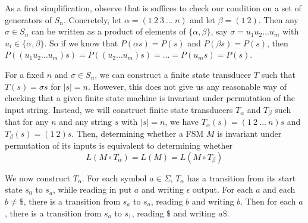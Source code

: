\documentclass{llncs}
\begin{document}
    As a first simplification, observe that is
    suffices to check our condition on a set
    of generators of $S_n$.
    Concretely, let $\alpha = (1\ 2\ 3\ ...\ n)$
    and let $\beta = (1\ 2)$.
    Then any $\sigma \in S_n$ can be written as
    a product of elements of $\{\alpha,\beta\}$,
    say $\sigma = u_1 u_2\ldots u_m$ with
    $u_i \in \{\alpha,\beta\}$.
    So if we know that $P(\alpha s) = P(s)$
    and $P(\beta s) = P(s)$, then
    $P((u_1 u_2 \ldots u_m)s)
    = P((u_2 \ldots u_m)s)
    = \ldots = P(u_ms) = P(s) $.

    For a fixed $n$ and $\sigma \in S_n$,
    we can construct a finite state transducer
    $T$ such that $T(s) = \sigma s$ for $|s|=n$.
    However, this does not give us any
    reasonable way of checking that a given
    finite state machine is invariant under permutation
    of the input string.
    Instead, we will construct finite state
    transducers $T_{\alpha}$ and $T_{\beta}$
    such that for any $n$ and any string $s$
    with $|s|=n$, we have
    $T_{\alpha}(s)=(1\ 2\ \ldots\ n) s$ and
    $T_{\beta}(s) = (1\ 2) s$.
    Then, determining whether a FSM $M$ is
    invariant under permutation of its inputs
    is equivalent to determining whether
    \[
      L(M \circ T_\alpha) = L(M) = L(M \circ T_\beta)
    \]

    We now construct $T_\alpha$.
    For each symbol $a \in \Sigma$,
    $T_\alpha$ has a transition from its start
    state $s_0$ to $s_a$, while reading in put $a$ and
    writing $\epsilon$ output.
    For each $a$ and each $b\ne \$$, there is a
    transition from $s_a$ to $s_a$, reading $b$
    and writing $b$.
    Then for each $a$, there is a transition from
    $s_a$ to $s_1$, reading $\$$ and writing $a\$$.
\end{document}
